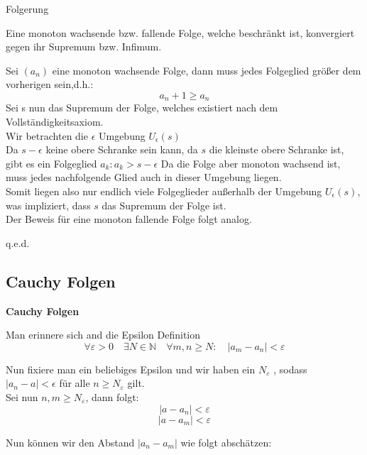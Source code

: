 \documentclass[smallheadings,headsepline,12pt,a4paper]{scrartcl}
\begin{document}
\item[Folgerung]
\item Eine monoton wachsende bzw. fallende Folge, welche beschränkt ist, konvergiert gegen ihr Supremum bzw. Infimum. 
\item Sei $(a_n)$ eine monoton wachsende Folge, dann muss jedes Folgeglied größer dem vorherigen sein,d.h.:
$$ a_n+1 \geq a_n $$ 
Sei s nun das Supremum der Folge, welches existiert nach dem Vollständigkeitsaxiom. \\
Wir betrachten die $\epsilon$ Umgebung $U_\epsilon (s)$ \\
Da $s-\epsilon$ keine obere Schranke sein kann, da $s$ die kleinste obere Schranke ist, gibt es ein Folgeglied $a_k : a_k > s- \epsilon $ Da die Folge aber monoton wachsend ist, muss jedes nachfolgende Glied auch in dieser Umgebung liegen. \\
Somit liegen also nur endlich viele Folgeglieder außerhalb der Umgebung $U_\epsilon (s)$, was impliziert, dass $s$ das Supremum der Folge ist.\\
Der Beweis für eine monoton fallende Folge folgt analog. \\
\begin{flushright}
q.e.d.
\end{flushright}

\newpage

\subsection*{Cauchy Folgen}


\begin{center}
\item[\textbf{Cauchy Folgen}]
\end{center}
\item Man erinnere sich and die Epsilon Definition $$ \forall \varepsilon>0 \quad \exists N\in\mathbb{N} \quad \forall m,n \ge N \colon \quad \left|a_m-a_n \right|<\varepsilon $$

\item Nun fixiere man ein beliebiges Epsilon und wir haben ein $N_\varepsilon$ , sodass \\
$ |a_n -a | < \epsilon $ für alle $ n \geq N_\varepsilon $ gilt. \\
Sei nun $n,m \geq N_\varepsilon $, dann folgt: \\
$$ |a-a_n| < \varepsilon $$
$$ |a-a_m| < \varepsilon $$

\item Nun können wir den Abstand $|a_n-a_m|$ wie folgt abschätzen:
\end{document}
